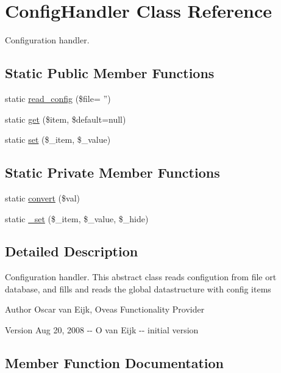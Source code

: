 \section{ConfigHandler Class Reference}
\label{classConfigHandler}


Configuration handler.  


\subsection*{Static Public Member Functions}
\begin{DoxyCompactItemize}
\item 
static \hyperlink{classConfigHandler_af61ee6f9f793e4cd0128c02e4e28bf90}{read\_\-config} (\$file= '')
\item 
static \hyperlink{classConfigHandler_aa8f6a7516588561626efccb8be5875ce}{get} (\$item, \$default=null)
\item 
static \hyperlink{classConfigHandler_a0f6d68b5d2f4da014209d449fc0f5996}{set} (\$\_\-item, \$\_\-value)
\end{DoxyCompactItemize}
\subsection*{Static Private Member Functions}
\begin{DoxyCompactItemize}
\item 
static \hyperlink{classConfigHandler_a9851c66d75db6a65c64aba5192173c14}{convert} (\$val)
\item 
static \hyperlink{classConfigHandler_a7a31419ae991ab50967444568277aa4c}{\_\-set} (\$\_\-item, \$\_\-value, \$\_\-hide)
\end{DoxyCompactItemize}


\subsection{Detailed Description}
Configuration handler. This abstract class reads configution from file ort database, and fills and reads the global datastructure with config items \begin{DoxyAuthor}{Author}
Oscar van Eijk, Oveas Functionality Provider 
\end{DoxyAuthor}
\begin{DoxyVersion}{Version}
Aug 20, 2008 -\/-\/ O van Eijk -\/-\/ initial version 
\end{DoxyVersion}


\subsection{Member Function Documentation}
